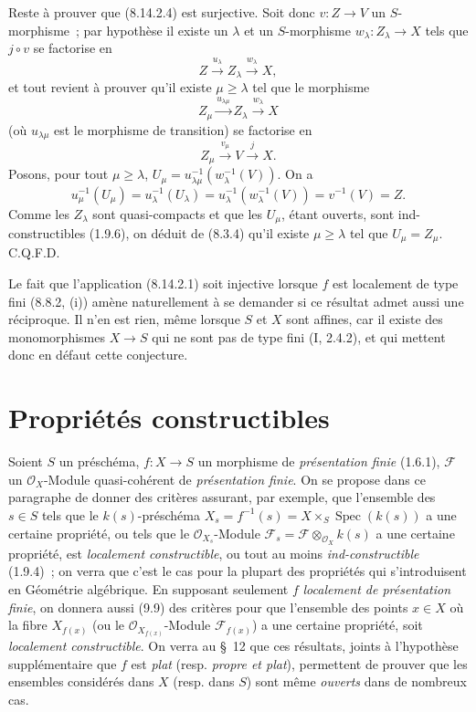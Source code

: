 Reste à prouver que (8.14.2.4) est surjective. Soit donc $v:Z\to V$ un
$S$-morphisme~; par hypothèse il existe un $\lambda$ et un $S$-morphisme
$w_\lambda:Z_\lambda\to X$ tels que $j\circ v$ se factorise en
\[
Z\xrightarrow{u_\lambda}Z_\lambda\xrightarrow{w_\lambda}X,
\]
et tout revient à prouver qu'il existe $\mu\geqslant\lambda$ tel que le
morphisme
\[
Z_\mu\xrightarrow{u_{\lambda\mu}}Z_\lambda
\xrightarrow{w_\lambda}X
\]
(où $u_{\lambda\mu}$ est le morphisme de transition) se factorise en
\[
Z_\mu\xrightarrow{v_\mu}V\xrightarrow{j}X.
\]
Posons, pour tout $\mu\geqslant\lambda$,
$U_\mu=u_{\lambda\mu}^{-1}(w_\lambda^{-1}(V))$. On a
\[
u_\mu^{-1}(U_\mu)=u_\lambda^{-1}(U_\lambda)
=u_\lambda^{-1}(w_\lambda^{-1}(V))=v^{-1}(V)=Z.
\]
Comme les $Z_\lambda$ sont quasi-compacts et que les $U_\mu$, étant ouverts,
sont ind-constructibles (1.9.6), on déduit de (8.3.4) qu'il existe
$\mu\geqslant\lambda$ tel que $U_\mu=Z_\mu$. C.Q.F.D.

\begin{remark}[8.14.3]
\label{IV.8.14.3-fr}
Le fait que l'application (8.14.2.1) soit injective lorsque $f$ est localement
de type fini (8.8.2, (i)) amène naturellement à se demander si ce résultat
admet aussi une réciproque. Il n'en est rien, même lorsque $S$ et $X$ sont
affines, car il existe des monomorphismes $X\to S$ qui ne sont pas de type fini
(I, 2.4.2), et qui mettent donc en défaut cette conjecture.
\end{remark}

\section{Propriétés constructibles}
\label{section:IV.9-fr}

Soient $S$ un préschéma, $f:X\to S$ un morphisme de
\emph{présentation finie} (1.6.1), $\mathcal F$ un $\mathcal O_X$-Module
quasi-cohérent de \emph{présentation finie}. On se propose dans ce paragraphe
de donner des critères assurant, par exemple, que l'ensemble des $s\in S$ tels
que le $k(s)$-préschéma
$X_s=f^{-1}(s)=X\times_S\operatorname{Spec}(k(s))$ a une certaine propriété,
ou tels que le $\mathcal O_{X_s}$-Module
$\mathcal F_s=\mathcal F\otimes_{\mathcal O_X}k(s)$ a une certaine propriété,
est \emph{localement constructible}, ou tout au moins
\emph{ind-constructible} (1.9.4)~; on verra que c'est le cas pour la plupart
des propriétés qui s'introduisent en Géométrie algébrique. En supposant
seulement $f$ \emph{localement de présentation finie}, on donnera aussi (9.9)
des critères pour que l'ensemble des points $x\in X$ où la fibre $X_{f(x)}$
(ou le $\mathcal O_{X_{f(x)}}$-Module $\mathcal F_{f(x)}$) a une certaine
propriété, soit \emph{localement constructible}. On verra au \S~12 que ces
résultats, joints à l'hypothèse supplémentaire que $f$ est \emph{plat}
(resp. \emph{propre et plat}), permettent de prouver que les ensembles
considérés dans $X$ (resp. dans $S$) sont même \emph{ouverts} dans de nombreux
cas.

